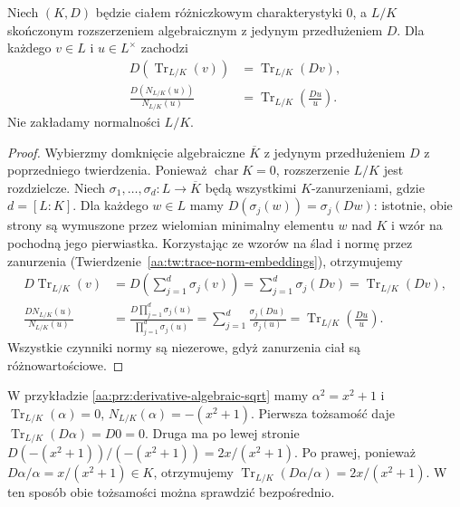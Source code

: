\begin{twierdzenie}
\label{aa:tw:differential-trace-norm}
Niech $(K,D)$ będzie ciałem różniczkowym
charakterystyki $0$, a $L/K$ skończonym rozszerzeniem
algebraicznym z jedynym przedłużeniem $D$.
Dla każdego $v\in L$ i $u\in L^\times$ zachodzi
\begin{equation}\label{eq:trace-norm}
\begin{aligned}
D\!\left(\operatorname{Tr}_{L/K}(v)\right)
&=\operatorname{Tr}_{L/K}(Dv),\\
\frac{D\!\left(N_{L/K}(u)\right)}{N_{L/K}(u)}
&=\operatorname{Tr}_{L/K}\!\left(\frac{Du}{u}\right).
\end{aligned}
\end{equation}
Nie zakładamy normalności $L/K$.
\end{twierdzenie}
\begin{proof}
Wybierzmy domknięcie algebraiczne $\overline K$
z jedynym przedłużeniem $D$ z poprzedniego
twierdzenia. Ponieważ $\operatorname{char}K=0$,
rozszerzenie $L/K$ jest rozdzielcze.
Niech $\sigma_1,\ldots,\sigma_d:L\to\overline K$
będą wszystkimi $K$-zanurzeniami, gdzie $d=[L:K]$.
Dla każdego $w\in L$ mamy
$D(\sigma_j(w))=\sigma_j(Dw)$: istotnie,
obie strony są wymuszone przez wielomian minimalny
elementu $w$ nad $K$ i wzór na pochodną jego
pierwiastka. Korzystając ze wzorów na ślad
i normę przez zanurzenia
(Twierdzenie~\ref{aa:tw:trace-norm-embeddings}),
otrzymujemy
\[
\begin{aligned}
D\operatorname{Tr}_{L/K}(v)
 &=D\left(\sum_{j=1}^d\sigma_j(v)\right)
  =\sum_{j=1}^d\sigma_j(Dv)
  =\operatorname{Tr}_{L/K}(Dv),\\
\frac{DN_{L/K}(u)}{N_{L/K}(u)}
 &=\frac{D\prod_{j=1}^d\sigma_j(u)}
         {\prod_{j=1}^d\sigma_j(u)}
  =\sum_{j=1}^d\frac{\sigma_j(Du)}{\sigma_j(u)}
  =\operatorname{Tr}_{L/K}\left(\frac{Du}{u}\right).
\end{aligned}
\]
Wszystkie czynniki normy są niezerowe,
gdyż zanurzenia ciał są różnowartościowe.
\end{proof}

\begin{przyklad}
\label{aa:prz:differential-quadratic-trace-norm}
W przykładzie \ref{aa:prz:derivative-algebraic-sqrt}
mamy $\alpha^2=x^2+1$ i
$\operatorname{Tr}_{L/K}(\alpha)=0$,
$N_{L/K}(\alpha)=-(x^2+1)$.
Pierwsza tożsamość daje
$\operatorname{Tr}_{L/K}(D\alpha)=D0=0$.
Druga ma po lewej stronie
$D(-(x^2+1))/(-(x^2+1))=2x/(x^2+1)$.
Po prawej, ponieważ $D\alpha/\alpha=x/(x^2+1)\in K$,
otrzymujemy
$\operatorname{Tr}_{L/K}(D\alpha/\alpha)=2x/(x^2+1)$.
W ten sposób obie tożsamości można sprawdzić bezpośrednio.
\end{przyklad}

